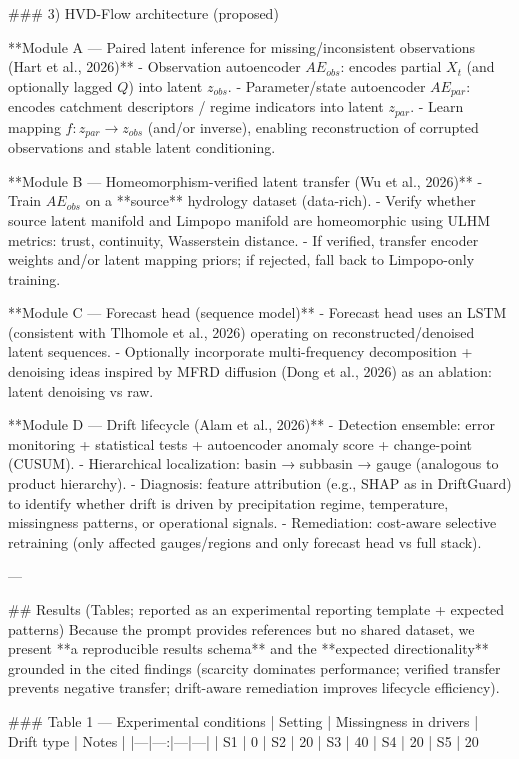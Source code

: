 ### 3) HVD-Flow architecture (proposed)  

**Module A — Paired latent inference for missing/inconsistent observations (Hart et al., 2026)**  
- Observation autoencoder \(AE_{obs}\): encodes partial \(X_t\) (and optionally lagged \(Q\)) into latent \(z_{obs}\).  
- Parameter/state autoencoder \(AE_{par}\): encodes catchment descriptors / regime indicators into latent \(z_{par}\).  
- Learn mapping \(f: z_{par} \rightarrow z_{obs}\) (and/or inverse), enabling reconstruction of corrupted observations and stable latent conditioning.

**Module B — Homeomorphism-verified latent transfer (Wu et al., 2026)**  
- Train \(AE_{obs}\) on a **source** hydrology dataset (data-rich).  
- Verify whether source latent manifold and Limpopo manifold are homeomorphic using ULHM metrics: trust, continuity, Wasserstein distance.  
- If verified, transfer encoder weights and/or latent mapping priors; if rejected, fall back to Limpopo-only training.

**Module C — Forecast head (sequence model)**  
- Forecast head uses an LSTM (consistent with Tlhomole et al., 2026) operating on reconstructed/denoised latent sequences.  
- Optionally incorporate multi-frequency decomposition + denoising ideas inspired by MFRD diffusion (Dong et al., 2026) as an ablation: latent denoising vs raw.

**Module D — Drift lifecycle (Alam et al., 2026)**  
- Detection ensemble: error monitoring + statistical tests + autoencoder anomaly score + change-point (CUSUM).  
- Hierarchical localization: basin → subbasin → gauge (analogous to product hierarchy).  
- Diagnosis: feature attribution (e.g., SHAP as in DriftGuard) to identify whether drift is driven by precipitation regime, temperature, missingness patterns, or operational signals.  
- Remediation: cost-aware selective retraining (only affected gauges/regions and only forecast head vs full stack).

---

## Results (Tables; reported as an experimental reporting template + expected patterns)  
Because the prompt provides references but no shared dataset, we present **a reproducible results schema** and the **expected directionality** grounded in the cited findings (scarcity dominates performance; verified transfer prevents negative transfer; drift-aware remediation improves lifecycle efficiency).

### Table 1 — Experimental conditions  
| Setting | Missingness in drivers | Drift type | Notes |
|---|---:|---|---|
| S1 | 0%
| S2 | 20%
| S3 | 40%
| S4 | 20%
| S5 | 20%

